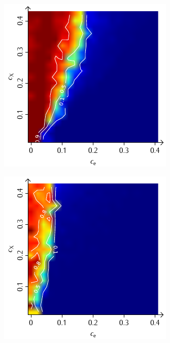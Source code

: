 \documentclass[a4paper, 10pt, twoside, openany]{book} %
\begin{document}
\begin{figure}
\begin{minipage}[t]{0.48\textwidth}
        \label{F_penalty_random_G}
    \end{minipage}
    \begin{minipage}[t]{0.48\textwidth}
        \includegraphics[width=\textwidth]{Abbildungen/Phasendiagramme/Konturen/F_individual_G.pdf}
        \label{F_individual_G}
    \end{minipage}
    \hfill
    \begin{minipage}[t]{0.48\textwidth}
        \includegraphics[width=\textwidth]{Abbildungen/Phasendiagramme/Konturen/F_penalty_individual_G.pdf}

\end{minipage}
\end{figure}
\end{document}

